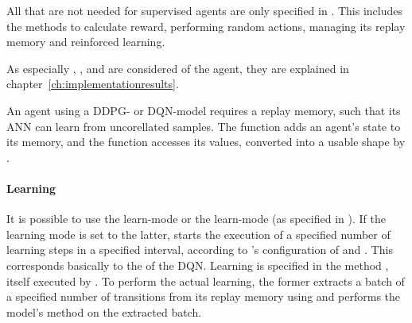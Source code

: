 All  that are not needed for supervised agents are only specified in . This includes the methods to calculate reward, performing random actions, managing its replay memory and reinforced learning.

As especially , ,  and  are considered  of the agent, they are explained in chapter~\ref{ch:implementationresults}. 

An agent using a DDPG- or DQN-model requires a replay memory, such that its ANN can learn from uncorellated samples. The function  adds an agent's state to its memory, and the function  accesses its values, converted into a usable shape by . 

\paragraph{Learning}

It is possible to use the  learn-mode or the  learn-mode (as specified in ). If the learning mode is set to the latter,  starts the execution of a specified number of learning steps in a specified interval, according to 's configuration of  and . This corresponds basically to the  of the DQN\cite{mnih_human-level_2015}. Learning is specified in the method , itself executed by . To perform the actual learning, the former extracts a batch of a specified number of transitions from its replay memory using  and performs the model's method  on the extracted batch. 

